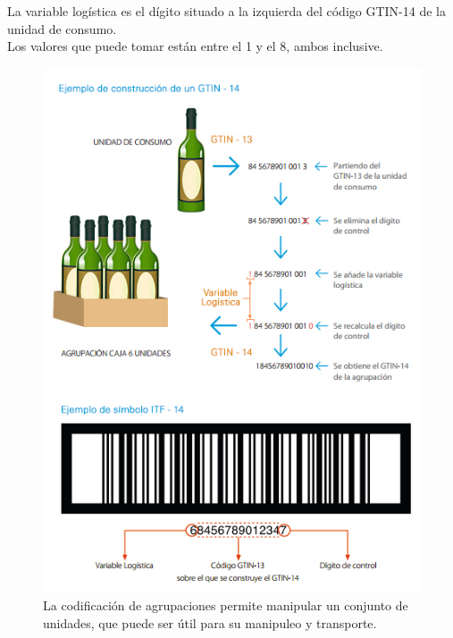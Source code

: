 La variable logística es el dígito situado a la izquierda del código GTIN-14 de la unidad de consumo.\\

Los valores que puede tomar están entre el 1 y el 8, ambos inclusive.\\ [\citep{CCCB:2019:Online}]

\begin{figure}
  \centering
    \includegraphics[scale=0.5]{./Capitulo2/figs/codificacion_agrupaciones_post_barras.jpg}
  \caption{La codificación de agrupaciones permite manipular un conjunto de unidades, que puede ser útil para su manipuleo y transporte.}
  \label{codificacion_agrupaciones_post_barras}
\end{figure}
